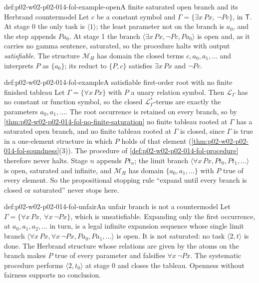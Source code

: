 \begin{hbexample}{def:p02-w02-p02-014-fol-example-open}{A finite saturated open branch and its Herbrand countermodel}
Let \(c\) be a constant symbol and \(\Gamma=\{\exists x\,Px,\ \neg Pc\}\), in
\(\mathsf T\).  At stage 0 the only task is \(\langle 1\rangle\); the least
parameter not on the branch is \(a_0\), and the step appends \(Pa_0\).  At
stage 1 the branch \(\langle\exists x\,Px,\neg Pc,Pa_0\rangle\) is open and,
as it carries no gamma sentence, saturated, so the procedure halts with
output \emph{satisfiable}.  The structure \(\mathcal M_H\) has domain the
closed terms \(c,a_0,a_1,\ldots\) and interprets \(P\) as \(\{a_0\}\); its
reduct to \(\{P,c\}\) satisfies \(\exists x\,Px\) and \(\neg Pc\).
\end{hbexample}

\begin{hbexample}{def:p02-w02-p02-014-fol-example}{A satisfiable first-order root with no finite finished tableau}
Let \(\Gamma=\{\forall x\,Px\}\) with \(P\) a unary relation symbol.  Then
\(\mathcal L_{\Gamma}\) has no constant or function symbol, so the closed
\(\mathcal L_{\Gamma}^{*}\)-terms are exactly the parameters \(a_0,a_1,\ldots\).
The root occurrence is retained on every branch, so by
\cref{thm:p02-w02-p02-014-fol-no-finite-saturation} no finite tableau rooted
at \(\Gamma\) has a saturated open branch, and no finite tableau rooted at
\(\Gamma\) is closed, since \(\Gamma\) is true in a one-element structure
in which \(P\) holds of that element
(\cref{thm:p02-w02-p02-014-fol-soundness}(3)).  The procedure of
\cref{def:p02-w02-p02-014-fol-procedure} therefore never halts.  Stage \(n\)
appends \(Pt_n\); the limit branch
\(\langle\forall x\,Px,Pt_0,Pt_1,\ldots\rangle\) is open, saturated
and infinite, and
\(\mathcal M_H\) has domain \(\{a_0,a_1,\ldots\}\) with \(P\) true of every
element.  So the propositional stopping rule ``expand until every branch is
closed or saturated'' never stops here.
\end{hbexample}

\begin{hbwarning}{def:p02-w02-p02-014-fol-unfair}{An unfair branch is not a countermodel}
Let \(\Gamma=\{\forall x\,Px,\ \forall x\,\neg Px\}\), which is
unsatisfiable.  Expanding only the first occurrence, at
\(a_0,a_1,a_2,\ldots\) in turn, is a legal infinite expansion sequence whose
single limit branch \(\langle\forall x\,Px,\forall x\,\neg
Px,Pa_0,Pa_1,\ldots\rangle\) is open.  It is not saturated: no task
\(\langle 2,t\rangle\) is done.  The Herbrand structure whose relations are given
by the atoms on the branch makes \(P\) true of every parameter and falsifies
\(\forall x\,\neg Px\).  The systematic
procedure performs \(\langle 2,t_0\rangle\) at stage 0 and closes the
tableau.  Openness without fairness supports no conclusion.
\end{hbwarning}

